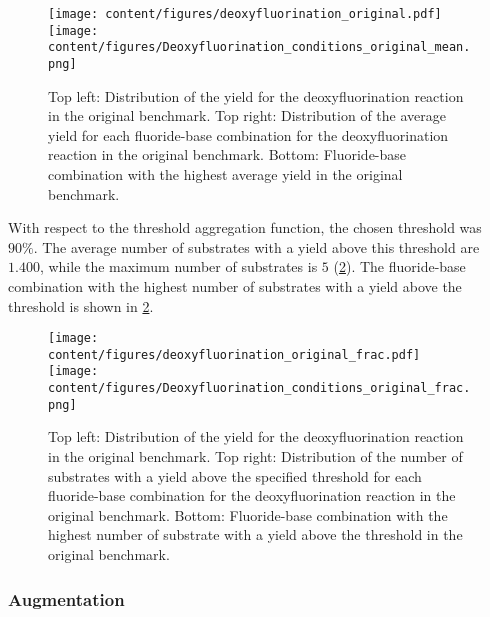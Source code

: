 \begin{figure}[h]
    \centering
    \texttt{[image: content/figures/deoxyfluorination\_original.pdf]}
    \texttt{[image: content/figures/Deoxyfluorination\_conditions\_original\_mean.png]}
    \caption{Top left: Distribution of the yield for the deoxyfluorination reaction in the original benchmark. Top right: Distribution of the average yield for each fluoride-base combination for the deoxyfluorination reaction in the original benchmark. Bottom: Fluoride-base combination with the highest average yield in the original benchmark.}
    \label{fig:Deoxyfluorination_EDA}
\end{figure}

With respect to the threshold aggregation function, the chosen threshold was $90\%$.
The average number of substrates with a yield above this threshold are $1.400$, while the maximum number of substrates is $5$ (\cref{fig:Deoxyfluorination_EDA_frac}).
The fluoride-base combination with the highest number of substrates with a yield above the threshold is shown in \cref{fig:Deoxyfluorination_EDA_frac}.

\begin{figure}[h]
    \centering
    \texttt{[image: content/figures/deoxyfluorination\_original\_frac.pdf]}
    \texttt{[image: content/figures/Deoxyfluorination\_conditions\_original\_frac.png]}
    \caption{Top left: Distribution of the yield for the deoxyfluorination reaction in the original benchmark. Top right: Distribution of the number of substrates with a yield above the specified threshold for each fluoride-base combination for the deoxyfluorination reaction in the original benchmark. Bottom: Fluoride-base combination with the highest number of substrate with a yield above the threshold in the original benchmark.}
    \label{fig:Deoxyfluorination_EDA_frac}
\end{figure}
\newpage
\subsubsection{Augmentation} \label{subsubsec: augmentation}

